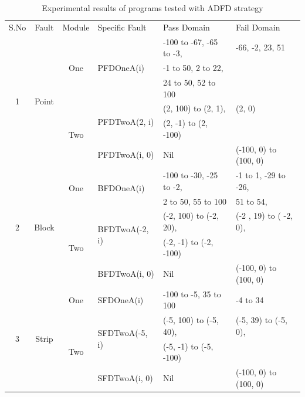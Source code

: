 \begin{table}[h]
\caption{Experimental results of programs tested with ADFD strategy}
\bigskip
\centering
{\renewcommand{\arraystretch}{1.3}
\scriptsize

\begin{tabular}{|c|c|c|l|l|l|}

\hline 


\multirow{2}{*}{S.No}	& \multirow{2}{*}{Fault }	& \multirow{2}{*}{Module} 	& \multirow{2}{*}{Specific Fault}	& \multirow{2}{*}{Pass Domain} 	& \multirow{2}{*}{Fail Domain} \\  
					& Domain				&  Dimension			&								&								&							\\ \hline 
\multirow{6}{*}{1} 	& \multirow{6}{*}{Point}	& \multirow{3}{*}{One}	& \multirow{3}{*}{PFDOneA(i)}		&	-100 to -67, -65 to -3, 		& -66, -2, 23, 51			 	\\  
					&						&						&								&	-1 to 50, 2 to 22, 			&							\\  
					&						&						&								&	24 to 50, 52 to 100			&							\\ \cline{3-6}
					&						& \multirow{3}{*}{Two}	& \multirow{2}{*}{PFDTwoA(2, i)}	&	(2, 100) to (2, 1),	 			&  (2, 0)						\\  
					&						&						&								&	(2, -1) to (2, -100)			&							\\ \cline{4-6}
					&						& 						&	PFDTwoA(i, 0)				&	Nil							& (-100, 0) to (100, 0)		\\  \hline



\multirow{5}{*}{2} 	& \multirow{5}{*}{Block}	& 	\multirow{2}{*}{One}	& \multirow{2}{*}{BFDOneA(i)}		&	-100 to -30, -25 to -2, 		& 	-1 to 1, -29 to -26,		 \\ 
					&						&						&								&	2 to 50, 55 to 100			&	51 to 54,				\\  \cline{3-6}
					&						&	\multirow{3}{*}{Two}	& \multirow{2}{*}{BFDTwoA(-2, i)}	&	(-2, 100) to (-2, 20), 			& 	(-2 , 19) to ( -2, 0), 		\\ 
					&						&						&								&     (-2, -1) to (-2, -100)			&							\\ \cline{4-6}
					&						& 						&	BFDTwoA(i, 0)				&	Nil							& 	(-100, 0) to (100, 0)		\\  \hline
				
				



\multirow{5}{*}{3} 	& \multirow{5}{*}{Strip}	& 	\multirow{2}{*}{One}	&	\multirow{2}{*}{SFDOneA(i)}	& \multirow{2}{*}{-100 to -5, 35 to 100}& 	\multirow{2}{*}{-4 to 34}	\\ 
					&						&						&								&									 &						\\ \cline{3-6}
					&						&	\multirow{3}{*}{Two}	& \multirow{2}{*}{SFDTwoA(-5, i)}	&	(-5, 100) to (-5, 40),				 &  (-5, 39) to (-5, 0), 		\\ 
					&						&						&								&	 (-5, -1) to (-5, -100)				&						\\ \cline{4-6}
					&						& 						&	SFDTwoA(i, 0)				&	Nil								&  (-100, 0) to (100, 0)	\\  \hline
				

\end{tabular}}
\end{table}
